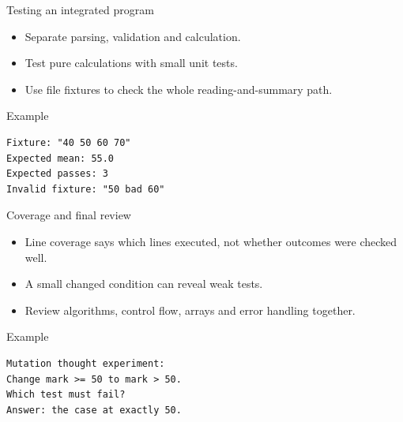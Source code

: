\documentclass[10pt,aspectratio=169]{beamer}
\begin{document}
\begin{frame}[fragile,t]{Testing an integrated program}
\begin{itemize}
\item Separate parsing, validation and calculation.
\item Test pure calculations with small unit tests.
\item Use file fixtures to check the whole reading-and-summary path.
\end{itemize}
\vspace{1mm}\begin{block}{Example}
\begin{lstlisting}
Fixture: "40 50 60 70"
Expected mean: 55.0
Expected passes: 3
Invalid fixture: "50 bad 60"
\end{lstlisting}
\end{block}
\end{frame}

\begin{frame}[fragile,t]{Coverage and final review}
\begin{itemize}
\item Line coverage says which lines executed, not whether outcomes were checked well.
\item A small changed condition can reveal weak tests.
\item Review algorithms, control flow, arrays and error handling together.
\end{itemize}
\vspace{1mm}\begin{block}{Example}
\begin{lstlisting}
Mutation thought experiment:
Change mark >= 50 to mark > 50.
Which test must fail?
Answer: the case at exactly 50.
\end{lstlisting}
\end{block}
\end{frame}
\end{document}
